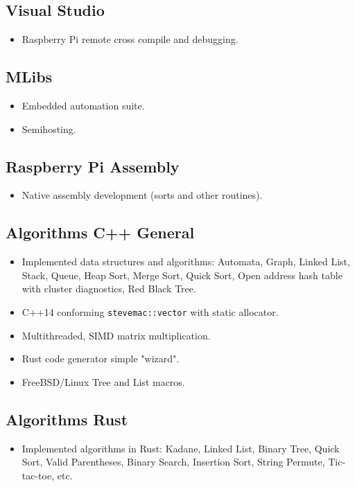 \documentclass{article}
\begin{document}
\subsection*{Visual Studio}
\begin{itemize}
    \item Raspberry Pi remote cross compile and debugging.
\end{itemize}

\subsection*{MLibs}
\begin{itemize}
    \item Embedded automation suite.
    \item Semihosting.
\end{itemize}

\subsection*{Raspberry Pi Assembly}
\begin{itemize}
    \item Native assembly development (sorts and other routines).
\end{itemize}

\subsection*{Algorithms C++ General}
\begin{itemize}
    \item Implemented data structures and algorithms: Automata, Graph, Linked List, Stack, Queue, Heap Sort, Merge Sort, Quick Sort, Open address hash table with cluster diagnostics, Red Black Tree.
    \item C++14 conforming \texttt{stevemac::vector} with static allocator.
    \item Multithreaded, SIMD matrix multiplication.
    \item Rust code generator simple "wizard".
    \item FreeBSD/Linux Tree and List macros.
\end{itemize}

\subsection*{Algorithms Rust}
\begin{itemize}
    \item Implemented algorithms in Rust: Kadane, Linked List, Binary Tree, Quick Sort, Valid Parentheses, Binary Search, Insertion Sort, String Permute, Tic-tac-toe, etc.
\end{itemize}
\end{document}
